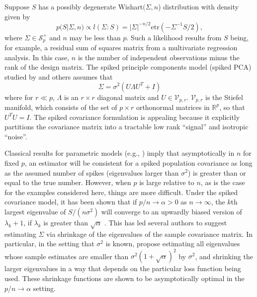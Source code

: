 \documentclass[12pt]{article}
\newcommand{\bl}[1]{{\mathbf #1}}
\newcommand{\etr}{\text{etr}}
\begin{document}
Suppose $S$ has a possibly degenerate Wishart$(\Sigma,n$)
distribution with density given by
\begin{equation} 
p(S | \Sigma, n) \propto l(\Sigma: S) =  |\Sigma|^{-n/2} \text{etr}( - \Sigma^{-1}  S/2 ) ,  
\label{eqn:lik}
\end{equation}
%
\noindent where $\Sigma \in \mathcal S_p^+$ and $n$ may be less than $p$.  Such
a likelihood results from $S$ being, for example, a residual sum
of squares matrix from a multivariate regression analysis. In this
case, $n$ is the number of independent observations minus the rank of
the design matrix.  The spiked principle components model (spiked PCA)
studied by \citet{Johnstone2001} and others assumes that
\begin{equation} 
\Sigma = \sigma^2 ( U  \Lambda  U^T  + I )
\label{eqn:spiked}
\end{equation}
%
\noindent where for $r \ll p$, $\Lambda$ is an $r\times r$ diagonal
matrix and $U \in \mathcal V_{p,r}$.  $\mathcal V_{p,r}$ is the
Stiefel manifold, which consists of the set of $p \times r$
orthonormal matrices in $\mathbb{R}^p$, so that $U^TU =
I$.  The spiked covariance formulation is appealing because it explicitly
partitions the covariance matrix into a tractable low rank ``signal''
and isotropic ``noise''.


Classical results for parametric models (e.g., \citet{Schwartz1965})
imply that asymptotically in $n$ for fixed $p$, an estimator will be
consistent for a spiked population covariance as long as the assumed
number of spikes (eigenvalues larger than $\sigma^2$) is greater than
or equal to the true number.  However, when $p$ is large relative to
$n$, as is the case for the examples considered here, things are more
difficult.  Under the spiked covariance model, it has been shown that
if $p/n \rightarrow \alpha >0$ as $n\rightarrow \infty$, the $k$th
largest eigenvalue of $S/(n\sigma^2)$ will converge to an upwardly
biased version of $\lambda_{k}+1$, if $\lambda_k$ is greater than
$\sqrt{\alpha}$ \citep{Baik2006, Paul2007} .  This has led several
authors to suggest estimating $\Sigma$ via shrinkage of the
eigenvalues of the sample covariance matrix. In particular, in the
setting that $\sigma^2$ is known, \citet{Donoho2013} propose
estimating all eigenvalues whose sample estimates are smaller than
$\sigma^2(1+\sqrt{\alpha})^2$ by $\sigma^2$, and shrinking the larger
eigenvalues in a way that depends on the particular loss function
being used.  These shrinkage functions are shown to be asymptotically
optimal in the $p/n\rightarrow \alpha$ setting.  
\end{document}

